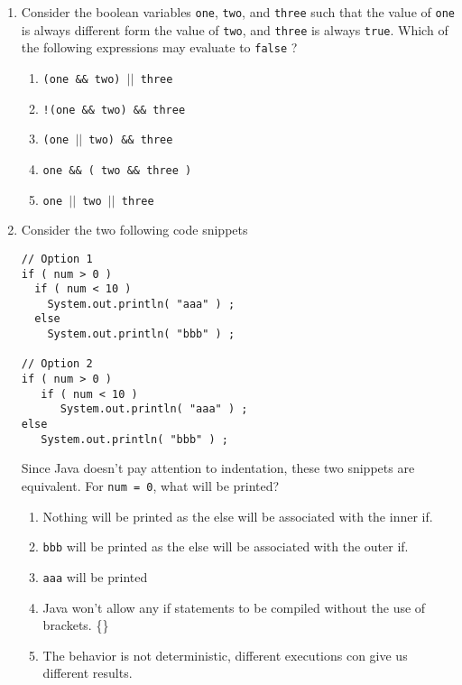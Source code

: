 \documentclass[CS180-S16-FinalExam.tex]{subfiles}
\begin{document}
\begin{enumerate}
\item 
Consider the boolean variables \texttt{one}, \texttt{two}, and \texttt{three} such that the value of \texttt{one} is always different form the value of \texttt{two}, and \texttt{three} is always \texttt{true}. Which of the following expressions may evaluate to \texttt{false} ?
\begin{enumerate}
\item \texttt{(one \&\& two) $|$$|$ three}
\item \texttt{!(one \&\& two) \&\& three}
\item  \texttt{(one $|$$|$ two) \&\& three}
\item \texttt{one \&\& ( two \&\& three )}\ifdraft \Ans \fi
\item  \texttt{one $|$$|$ two $|$$|$  three}
\end{enumerate}



\item
Consider the two following code snippets
\begin{lstlisting}
// Option 1
if ( num > 0 )   
  if ( num < 10 ) 
    System.out.println( "aaa" ) ;
  else
    System.out.println( "bbb" ) ;
 
// Option 2
if ( num > 0 )   
   if ( num < 10 ) 
      System.out.println( "aaa" ) ;
else
   System.out.println( "bbb" ) ;
\end{lstlisting}
Since Java doesn't pay attention to indentation, these two snippets are equivalent. For \texttt{num = 0}, what will be printed?
\begin{enumerate}
\item Nothing will be printed as the else will be associated with the inner if.  \ifdraft \Ans \fi
\item \texttt{bbb} will be printed as the else will be associated with the outer if.
\item \texttt{aaa} will be printed
\item Java won't allow any if statements to be compiled without the use of brackets. \{\}
\item  The behavior is not deterministic, different executions con give us different results. 
\end{enumerate}


\end{enumerate}
\end{document}
